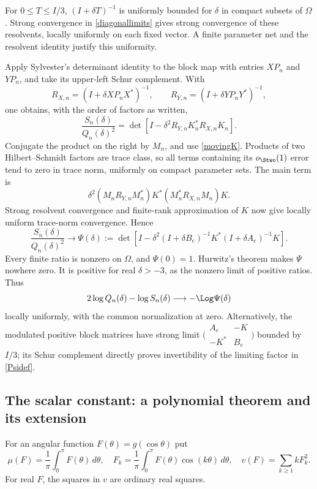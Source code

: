 For $0\le T\le I/3$, $(I+\delta T)^{-1}$ is uniformly bounded
for $\delta$ in compact subsets of $\Omega$. Strong convergence
in \eqref{diagonallimits} gives strong convergence of these resolvents,
locally uniformly on each fixed vector. A finite parameter net and
the resolvent identity justify this uniformity.

Apply Sylvester's determinant identity to the block map with entries
$XP_n$ and $YP_n$, and take its upper-left Schur complement. With
\[
 R_{X,n}=(I+\delta XP_nX^*)^{-1},\qquad
 R_{Y,n}=(I+\delta YP_nY^*)^{-1},
\]
one obtains, with the order of factors as written,
\begin{equation}\label{schur}
 \frac{S_n(\delta)}{Q_n(\delta)^2}
 =\det[I-\delta^2R_{Y,n}K_n^*R_{X,n}K_n].
\end{equation}
Conjugate the product on the right by $M_n$, and use
\eqref{movingK}. Products of two Hilbert--Schmidt factors are trace
class, so all terms containing its $o_{\Stwo}(1)$ error tend to zero
in trace norm, uniformly on compact parameter sets. The main term is
\[
 \delta^2(M_nR_{Y,n}M_n^*)K^*(M_n^*R_{X,n}M_n)K.
\]
Strong resolvent convergence and finite-rank approximation of $K$
now give locally uniform trace-norm convergence. Hence
\begin{equation}\label{Psidef}
 \frac{S_n(\delta)}{Q_n(\delta)^2}\longrightarrow\Psi(\delta):=
 \det\!\left[I-\delta^2(I+\delta B_e)^{-1}K^*
                              (I+\delta A_e)^{-1}K\right].
\end{equation}
Every finite ratio is nonzero on $\Omega$, and $\Psi(0)=1$.
Hurwitz's theorem makes $\Psi$ nowhere zero. It is positive for
real $\delta>-3$, as the nonzero limit of positive ratios. Thus
\begin{equation}\label{mixedlimit}
 2\log Q_n(\delta)-\log S_n(\delta)\longrightarrow-\Log\Psi(\delta)
\end{equation}
locally uniformly, with the common normalization at zero. Alternatively,
the modulated positive block matrices have strong limit
$\bigl(\begin{smallmatrix}A_e&-K\\-K^*&B_e\end{smallmatrix}\bigr)$
bounded by $I/3$; its Schur complement directly proves invertibility
of the limiting factor in \eqref{Psidef}.

\subsection{The scalar constant: a polynomial theorem and its extension}
For an angular function $F(\theta)=g(\cos\theta)$ put
\[
 \mu(F)=\frac1\pi\int_0^\pi F(\theta)\,d\theta,\quad
 F_k=\frac1\pi\int_0^\pi F(\theta)\cos(k\theta)\,d\theta,\quad
 v(F)=\sum_{k\ge1}kF_k^2.
\]
For real $F$, the squares in $v$ are ordinary real squares.

